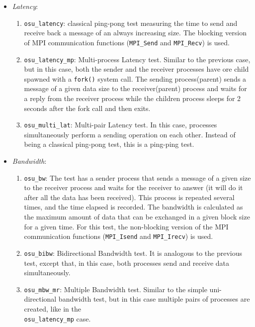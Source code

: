 \begin{itemize}
\itemsep0em
\item \textit{Latency}:
  \begin{enumerate}
    \itemsep0em
    \item \texttt{osu\_latency}: classical ping-pong test measuring the time to
      send and receive back a message of an always increasing size. The blocking
      version of MPI communication functions (\texttt{MPI\_Send} and
      \texttt{MPI\_Recv}) is used.
    \item \texttt{osu\_latency\_mp}: Multi-process Latency test. Similar to the
      previous case, but in this case, both the sender and the receiver
      processes have ore child spawned with a \texttt{fork()} system call. The
      sending process(parent) sends a message of a given data size to the
      receiver(parent) process and waits for a reply from the receiver process
      while the children process sleeps for 2 seconds after the fork call and
      then exits.
    \item \texttt{osu\_multi\_lat}: Multi-pair Latency test. In this case,
      processes simultaneously perform a sending operation on each other.
      Instead of being a classical ping-pong test, this is a ping-ping test.
  \end{enumerate}
\item \textit{Bandwidth}:
  \begin{enumerate}
    \itemsep0em
    \item \texttt{osu\_bw}: The test has a sender process that sends a message of
      a given size to the receiver process and waits for the receiver to answer
      (it will do it after all the data has been received).
      This process is repeated several times, and the time elapsed is recorded.
      The bandwidth is calculated as the maximum amount of data that can be
      exchanged in a given block size for a given time.
      For this test, the non-blocking version of the MPI communication functions
      (\texttt{MPI\_Isend} and \texttt{MPI\_Irecv}) is used.
    \item \texttt{osu\_bibw}: Bidirectional Bandwidth test. It is analogous to the
      previous test, except that, in this case, both processes send and receive
      data simultaneously.
    \item \texttt{osu\_mbw\_mr}: Multiple Bandwidth test. Similar to the simple
      uni-directional bandwidth test, but in this case multiple pairs of
      processes are created, like in the \\ \texttt{osu\_latency\_mp} case.
  \end{enumerate}
\end{itemize}



